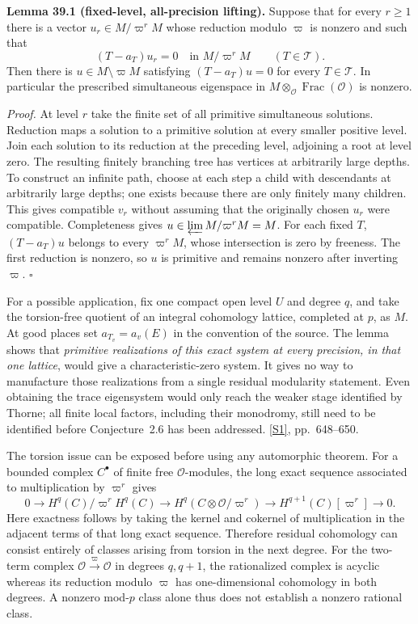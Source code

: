 \documentclass[11pt,a4paper]{article}
\newcommand{\sref}[2]{\hyperlink{source:#1:#2}{[S#2]}}
\numberwithin{equation}{section}
\begin{document}
\textbf{Lemma 39.1 (fixed-level, all-precision lifting).}
Suppose that for every $r\ge1$ there is a vector $u_r\in M/\varpi^rM$ whose
reduction modulo $\varpi$ is nonzero and such that
\[
 (T-a_T)u_r=0\quad\text{in }M/\varpi^rM\qquad(T\in\mathcal T).
\]
Then there is $u\in M\setminus\varpi M$ satisfying $(T-a_T)u=0$ for every
$T\in\mathcal T$. In particular the prescribed simultaneous eigenspace in
$M\otimes_{\mathcal O}\operatorname{Frac}(\mathcal O)$ is nonzero.

\emph{Proof.}
At level $r$ take the finite set of all primitive simultaneous solutions.
Reduction maps a solution to a primitive solution at every smaller positive
level. Join each solution to its reduction at the preceding level, adjoining
a root at level zero. The resulting finitely branching tree has vertices at
arbitrarily large depths. To construct an infinite path, choose at each step
a child with descendants at arbitrarily large depths; one exists because
there are only finitely many children. This gives compatible $v_r$ without
assuming that the originally chosen $u_r$ were compatible. Completeness gives
$u\in\varprojlim M/\varpi^rM=M$. For each fixed $T$, $(T-a_T)u$ belongs to
every $\varpi^rM$, whose intersection is zero by freeness. The first reduction
is nonzero, so $u$ is primitive and remains nonzero after inverting $\varpi$.
\hfill$\square$

For a possible application, fix one compact open level $U$ and degree $q$,
and take the torsion-free quotient of an integral cohomology lattice, completed
at $p$, as $M$. At good places set $a_{T_v}=a_v(E)$ in the convention of the
source. The lemma shows that \emph{primitive realizations of this exact system
at every precision, in that one lattice}, would give a characteristic-zero
system. It gives no way to manufacture those realizations from a single
residual modularity statement. Even obtaining the trace eigensystem would
only reach the weaker stage identified by Thorne; all finite local factors,
including their monodromy, still need to be identified before Conjecture~2.6
has been addressed. \sref{statement}{1}, pp.~648--650.

The torsion issue can be exposed before using any automorphic theorem. For a
bounded complex $C^\bullet$ of finite free $\mathcal O$-modules, the long exact
sequence associated to multiplication by $\varpi^r$ gives
\[
0\longrightarrow H^q(C)/\varpi^rH^q(C)
\longrightarrow H^q(C\otimes\mathcal O/\varpi^r)
\longrightarrow H^{q+1}(C)[\varpi^r]\longrightarrow0.
\]
Here exactness follows by taking the kernel and cokernel of multiplication in
the adjacent terms of that long exact sequence. Therefore residual cohomology
can consist entirely of classes arising from torsion in the next degree.
For the two-term complex $\mathcal O\xrightarrow{\varpi}\mathcal O$ in degrees
$q,q+1$, the rationalized complex is acyclic whereas its reduction modulo
$\varpi$ has one-dimensional cohomology in both degrees. A nonzero mod-$p$
class alone thus does not establish a nonzero rational class.
\end{document}
